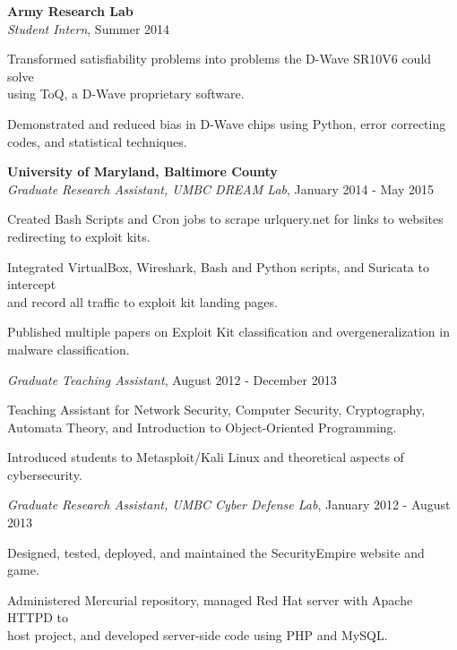 \medskip
\atab \textbf{Army Research Lab}\\
\btab \textit{Student Intern}, Summer 2014\\
\begin{my_list}
\item Transformed satisfiability problems into problems the D-Wave SR10V6 could solve\\ \tab \tab using ToQ, a D-Wave proprietary software.
\item Demonstrated and reduced bias in D-Wave chips using Python, error correcting\\ \tab \tab codes, and statistical techniques.
\end{my_list}

\medskip
\atab \textbf{University of Maryland, Baltimore County}\\
\btab \textit{Graduate Research Assistant, UMBC DREAM Lab}, January 2014 - May 2015\\
\begin{my_list}
\item Created Bash Scripts and Cron jobs to scrape urlquery.net for links to websites\\ \tab \tab redirecting to exploit kits.
\item Integrated VirtualBox, Wireshark, Bash and Python scripts, and Suricata to intercept\\ \tab \tab and record all traffic to exploit kit landing pages.
\item Published multiple papers on Exploit Kit classification and overgeneralization in\\ \tab \tab malware classification.
\end{my_list}

\btab \textit{Graduate Teaching Assistant}, August 2012 - December 2013\\
\begin{my_list}
\item Teaching Assistant for Network Security, Computer Security, Cryptography,\\ \tab \tab Automata Theory, and Introduction to Object-Oriented Programming.
\item Introduced students to Metasploit/Kali Linux and theoretical aspects of cybersecurity.
\end{my_list}

\btab \textit{Graduate Research Assistant, UMBC Cyber Defense Lab}, January 2012 - August 2013\\
\begin{my_list}
\item Designed, tested, deployed, and maintained the SecurityEmpire website and game.
\item Administered Mercurial repository, managed Red Hat server with Apache HTTPD to\\ \tab \tab host project, and developed server-side code using PHP and MySQL.
\end{my_list}

